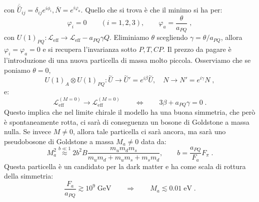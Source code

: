 \documentclass[12pt,a4paper]{article}
\theoremstyle{definition}
\newcommand{\lag}{\mathcal{L}}
\numberwithin{equation}{section}
\begin{document}
con $\overline{\stackrel{\sim}{U}}_{ij}=\delta_{ij}e^{i\phi_i},\overline{N}=e^{i\varphi_a}$. Quello che si trova è che il minimo si ha per:
\begin{equation}
\varphi_i=0\qquad (i=1,2,3),\qquad \varphi_a=\frac{\theta}{a_{PQ}}\;,
\end{equation}
con $U(1)_{PQ}:\lag_{\mathrm{eff}}\to\lag_{\mathrm{eff}}-a_{PQ}\gamma Q$. Eliminiamo $\theta$ scegliendo $\gamma=\theta/a_{PQ}$, allora $\varphi_i=\varphi_a=0$ e si recupera l'invarianza sotto $P,T,CP$. Il prezzo da pagare è l'introduzione di una nuova particella di massa molto piccola. Osserviamo che se poniamo $\theta=0$,
$$
U(1)_A\otimes U(1)_{PQ}:\stackrel{\sim}{U}\to\stackrel{\sim}{U}'=e^{i\beta}\stackrel{\sim}{U}, \quad N\to N'=e^{i\gamma}N\;,
$$
e:
$$
\lag_{\mathrm{eff}}^{(M=0)}\to\lag_{\mathrm{eff}}^{(M=0)} \qquad \Longleftrightarrow \qquad 3\beta+a_{PQ}\gamma=0\;.
$$
Questo implica che nel limite chirale il modello ha una buona simmetria, che però è spontaneamente rotta, ci sarà di conseguenza un bosone di Goldstone a massa nulla. Se invece $M\ne 0$, allora tale particella ci sarà ancora, ma sarà uno pseudobosone di Goldstone a massa $M_a\ne 0$ data da:
$$
M_a^2\stackrel{b\ll 1}{\approx} 2b^2B\frac{m_um_dm_s}{m_um_d+m_um_s+m_sm_d},\qquad b=\frac{a_{PQ}}{F_a}F_{\pi}\;.
$$
Questa particella è un candidato per la dark matter e ha come scala di rottura della simmetria:
$$
\frac{F_a}{a_{PQ}}\gtrsim 10^9\;\mathrm{GeV}\qquad \Longrightarrow\qquad M_a\lesssim 0.01\;\mathrm{eV}\;.
$$
\end{document}
